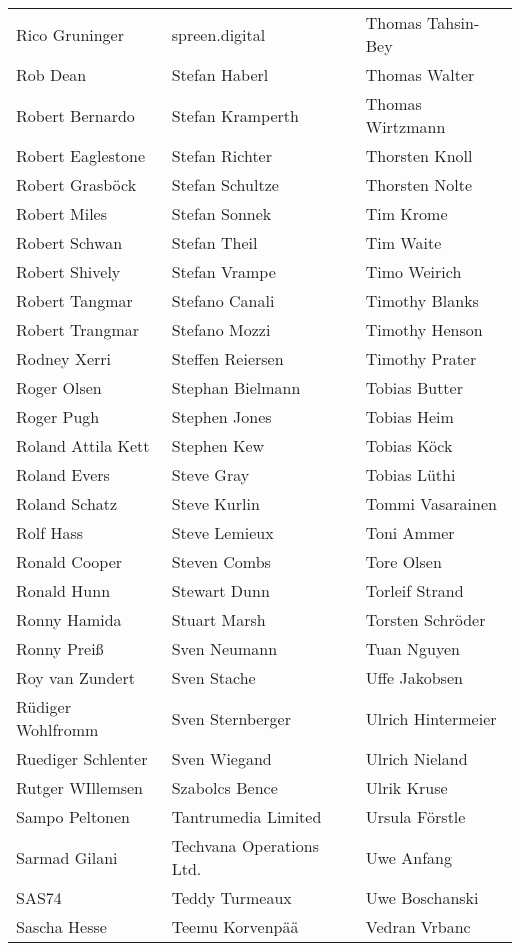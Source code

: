 \begin{tabular}{p{4cm}p{4cm}p{4cm}}
Rico Gruninger & spreen.digital & Thomas Tahsin-Bey \\
Rob Dean & Stefan Haberl & Thomas Walter \\
Robert Bernardo & Stefan Kramperth & Thomas Wirtzmann \\
Robert Eaglestone & Stefan Richter & Thorsten Knoll \\
Robert Grasböck & Stefan Schultze & Thorsten Nolte \\
Robert Miles & Stefan Sonnek & Tim Krome \\
Robert Schwan & Stefan Theil & Tim Waite \\
Robert Shively & Stefan Vrampe & Timo Weirich \\
Robert Tangmar & Stefano Canali & Timothy Blanks \\
Robert Trangmar & Stefano Mozzi & Timothy Henson \\
Rodney Xerri & Steffen Reiersen & Timothy Prater \\
Roger Olsen & Stephan Bielmann & Tobias Butter \\
Roger Pugh & Stephen Jones & Tobias Heim \\
Roland Attila Kett & Stephen Kew & Tobias Köck \\
Roland Evers & Steve Gray & Tobias Lüthi \\
Roland Schatz & Steve Kurlin & Tommi Vasarainen \\
Rolf Hass & Steve Lemieux & Toni Ammer \\
Ronald Cooper & Steven Combs & Tore Olsen \\
Ronald Hunn & Stewart Dunn & Torleif Strand \\
Ronny Hamida & Stuart Marsh & Torsten Schröder \\
Ronny Preiß & Sven Neumann & Tuan Nguyen \\
Roy van Zundert & Sven Stache & Uffe Jakobsen \\
Rüdiger Wohlfromm & Sven Sternberger & Ulrich Hintermeier \\
Ruediger Schlenter & Sven Wiegand & Ulrich Nieland \\
Rutger WIllemsen & Szabolcs Bence & Ulrik Kruse \\
Sampo Peltonen & Tantrumedia Limited & Ursula Förstle \\
Sarmad Gilani & Techvana Operations Ltd. & Uwe Anfang \\
SAS74 & Teddy Turmeaux & Uwe Boschanski \\
Sascha Hesse & Teemu Korvenpää & Vedran Vrbanc \\

\end{tabular}

